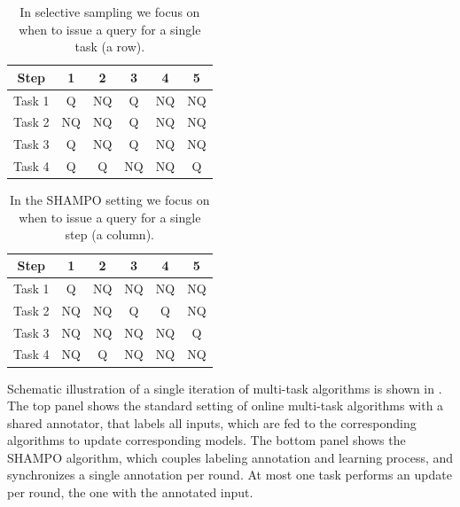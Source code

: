 \begin{table}[htp]
\begin{center}
{
\centering
\begin{tabular}{|c c c c c c|} \hline
 Step &	1 &	2 &	3 &	4 &	5 \\  \hline
 Task 1 &	Q      &	NQ &	Q &	NQ &	NQ \\ \hline
 Task 2 &	NQ   &	NQ &	Q &	NQ &	NQ \\ \hline
 Task 3 &	Q      &	 NQ &	Q &	NQ &	NQ \\ \hline
 Task 4 &	Q      &	Q &	NQ &	NQ &	Q \\ \hline
\end{tabular}
}
\end{center}
\caption{In selective sampling we focus on when to issue a query for a single task (a row).}
\label{tab:multitask_selective_sampling_example}
\end{table}

\begin{table}[htp]
\begin{center}
{
\centering
\begin{tabular}{|c c c c c c|} \hline
 Step &	1 &	2 &	3 &	4 &	5 \\  \hline
 Task 1 &	Q &	  NQ &	NQ &	NQ &	NQ \\ \hline
 Task 2 &	NQ &	NQ &	Q &	Q &	NQ \\ \hline
 Task 3 &	NQ &	 NQ &	NQ &	NQ &	Q \\ \hline
 Task 4 &	NQ &	Q &	NQ &	NQ &	NQ \\ \hline
\end{tabular}
}
\end{center}
\label{tab:multitask_SHAMPO_example} 
\caption{ In the SHAMPO setting we focus on when to issue a query for a single step (a column).}
\end{table}


Schematic illustration of a single iteration of multi-task algorithms is shown in . 
The top panel shows the standard setting of online multi-task algorithms with a shared annotator, that 
labels all inputs, which are fed to the corresponding algorithms to update corresponding models. The
bottom panel shows the SHAMPO algorithm, which couples labeling
annotation and learning process, and synchronizes a single annotation
per round.  At most one task performs an update per round, the one
with the annotated input.

